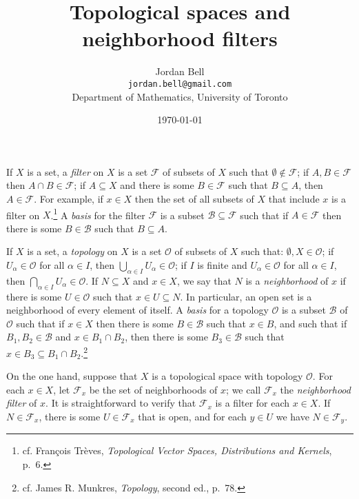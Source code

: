 \documentclass{article}
\begin{document}
\title{Topological spaces and neighborhood filters}
\author{Jordan Bell\\ \texttt{jordan.bell@gmail.com}\\Department of Mathematics, University of Toronto}
\date{\today}
\maketitle

If $X$ is a set, a {\em filter} on $X$ is a set $\mathcal{F}$ of subsets of $X$ such that $\emptyset \not \in \mathcal{F}$; if $A,B \in \mathcal{F}$ then $A \cap B \in \mathcal{F}$;
if $A \subseteq X$ and there is some $B \in \mathcal{F}$ such that $B \subseteq A$, then $A \in \mathcal{F}$. For example, if $x \in X$ then the set of all subsets of $X$ that include
$x$ is a filter on $X$.\footnote{cf. Fran{\c c}ois Tr\`eves, {\em Topological Vector Spaces, Distributions and Kernels}, p.~6.}
A {\em basis} for the filter $\mathcal{F}$ is a subset $\mathcal{B} \subseteq \mathcal{F}$ such that if $A \in \mathcal{F}$ then there is some $B \in \mathcal{B}$ such that
$B \subseteq A$.


If $X$ is a set, a {\em topology} on $X$ is a set $\mathcal{O}$ of subsets of $X$ such that: $\emptyset, X \in \mathcal{O}$; 
if $U_\alpha \in \mathcal{O}$ for all $\alpha \in I$, then $\bigcup_{\alpha \in I} U_\alpha \in \mathcal{O}$; if $I$ is finite and
$U_\alpha \in \mathcal{O}$ for all $\alpha \in I$, then $\bigcap_{\alpha \in I} U_\alpha \in \mathcal{O}$. If $N \subseteq X$ and $x \in X$, we say that
$N$ is a {\em neighborhood} of $x$ if there is some $U \in \mathcal{O}$ such that $x \in U \subseteq N$. In particular, an open set is a neighborhood of every element of itself.
A {\em basis} for a topology $\mathcal{O}$ is a subset $\mathcal{B}$ of $\mathcal{O}$ such that if $x \in X$ then there is some $B \in \mathcal{B}$ such that $x \in B$, and such that
if $B_1,B_2 \in \mathcal{B}$ and $x \in B_1 \cap B_2$, then there is some $B_3 \in \mathcal{B}$ such that $x \in B_3 \subseteq B_1 \cap B_2$.\footnote{cf.
James R. Munkres, {\em Topology}, second ed., p.~78.}

On the one hand,
suppose that $X$ is a topological space with topology $\mathcal{O}$. For each $x \in X$, let $\mathcal{F}_x$ be the set of neighborhoods of $x$; we call
$\mathcal{F}_x$ the {\em neighborhood filter} of $x$. It is straightforward to verify that
$\mathcal{F}_x$ is a filter for each $x \in X$. If $N \in \mathcal{F}_x$, there is some $U \in \mathcal{F}_x$ that is open, and for each $y \in U$ we have $N \in \mathcal{F}_y$. 
\end{document}
